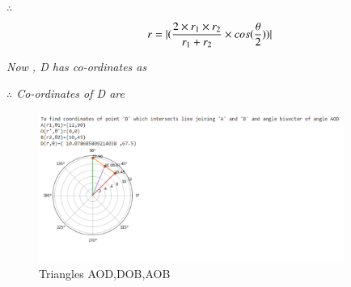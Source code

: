 \documentclass[journal,12pt,twocolumn]{IEEEtran}
\begin{document}
$\therefore$
\begin{equation}
 r = \lvert(\dfrac{2 \times r_1 \times r_2}{r_1+r_2}\times cos(\dfrac{\theta}{2}))\rvert
\end{equation}

\textsl{ }

\textsl{Now , D has co-ordinates as }

\textsl{ }

\textsl{$\therefore$ Co-ordinates of D are }

\begin{figure}[!ht]
    \includegraphics[width= 10cm,height = 5 cm]{BoP_assignment_1.PNG}
    \caption{Triangles AOD,DOB,AOB}
    \label{fig:Quad PQRS}
\end{figure}
\end{document}
